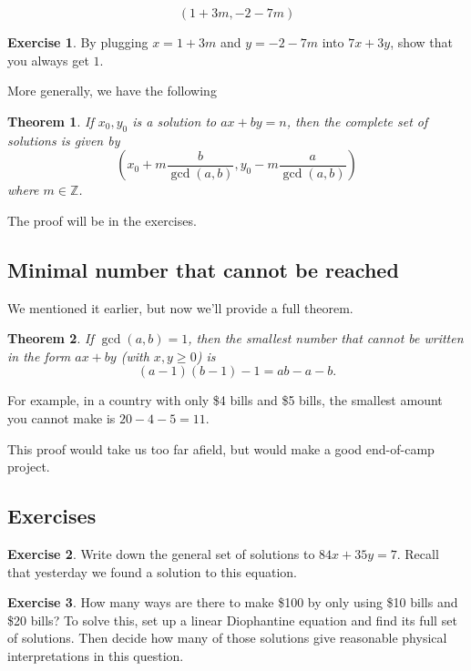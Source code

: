 \documentclass[11pt]{article}
\newtheorem{thm}{Theorem}
\theoremstyle{definition}
\newtheorem{exercise}{Exercise}
\numberwithin{thm}{section}
\begin{document}
\[
	(1 + 3m, -2 -7m)
\]

\begin{exercise} By plugging $x = 1+3m$ and $y = -2-7m$ into $7x+3y$, show that you always get $1$.
\end{exercise}

More generally, we have the following
\begin{thm} If $x_0, y_0$ is a solution to $ax+by=n$, then the complete set of solutions is given by
\[
	\left(x_0 + m\frac{b}{\gcd(a,b)}, y_0 - m\frac{a}{\gcd(a,b)} \right)
\]
where $m \in \mathbb{Z}$.
\end{thm}

The proof will be in the exercises.

\subsection{Minimal number that cannot be reached}

We mentioned it earlier, but now we'll provide a full theorem.

\begin{thm} If $\gcd(a,b)=1$, then the smallest number that cannot be written in the form $ax+by$ (with $x,y \geq 0$) is
\[
	(a-1)(b-1) - 1 = ab - a - b.
\]
\end{thm}

For example, in a country with only \$4 bills and \$5 bills, the smallest amount you cannot make is $20-4-5 = 11$.

This proof would take us too far afield, but would make a good end-of-camp project.

\subsection{Exercises}

\begin{exercise} Write down the general set of solutions to $84x + 35y = 7$. Recall that yesterday we found a solution to this equation.
\end{exercise}

\begin{exercise} \label{ex:bens} How many ways are there to make \$100 by only using \$10 bills and \$20 bills? To solve this, set up a linear Diophantine equation and find its full set of solutions. Then decide how many of those solutions give reasonable physical interpretations in this question.
\end{exercise}
\end{document}
